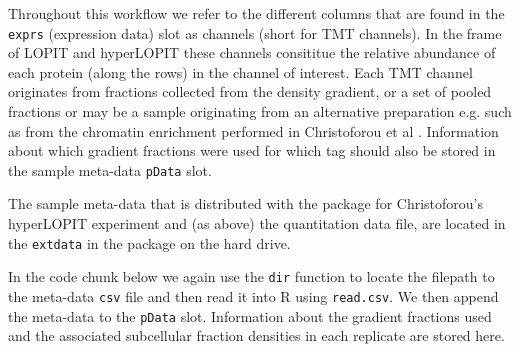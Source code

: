 Throughout this workflow we refer to the different columns that
are found in the \texttt{exprs} (expression data) slot as channels (short for TMT channels).
In the frame of LOPIT and hyperLOPIT these channels consititue the
relative abundance of each protein (along the rows) in the channel of
interest. Each TMT channel originates from fractions collected from
the density gradient, or a set of pooled fractions or may be a sample
originating from an alternative preparation e.g. such as from the
chromatin enrichment performed in Christoforou et al \cite{hyper}.
Information about which gradient fractions were used for which tag
should also be stored in the sample meta-data \texttt{pData} slot.

The sample meta-data that is distributed with the
 package for Christoforou's
hyperLOPIT experiment and (as above) the quantitation data file, are
located in the \texttt{extdata} in the 
package on the hard drive.

In the code chunk below we again use the
\texttt{dir} function to locate the filepath to the meta-data \texttt{csv} file and
then read it into R using \texttt{read.csv}. We then append the meta-data to
the \texttt{pData} slot.  Information about the gradient fractions used and
the associated subcellular fraction densities in %
each replicate are stored here.

